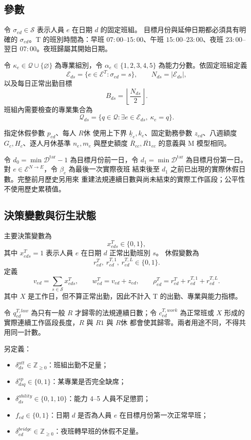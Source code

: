 \documentclass[a4paper,12pt]{article}
\begin{document}
\subsection{參數}

令 \(\sigma_{ed}\in\mathcal{S}\) 表示人員 \(e\) 在日期 \(d\) 的固定班組。
目標月份與延伸日期都必須具有明確的 \(\sigma_{ed}\)。T 的班別時間為：早班
\(07{:}00\)--\(15{:}00\)、午班 \(15{:}00\)--\(23{:}00\)、夜班
\(23{:}00\)--翌日 \(07{:}00\)。夜班歸屬其開始日期。

令 \(\kappa_e\in\mathcal{Q}\cup\{\varnothing\}\) 為專業組別，令
\(\alpha_e\in\{1,2,3,4,5\}\) 為能力分數。依固定班組定義
\[
  \mathcal{E}_{ds}
  =
  \{e\in\mathcal{E}^{T}:\sigma_{ed}=s\},
  \qquad
  N_{ds}=|\mathcal{E}_{ds}|,
\]
以及每日正常出勤目標
\[
  B_{ds}=\left\lfloor\frac{N_{ds}}{2}\right\rfloor.
\]
班組內需要檢查的專業集合為
\[
  \mathcal{Q}_{ds}
  =
  \{q\in\mathcal{Q}:\exists e\in\mathcal{E}_{ds},\ \kappa_e=q\}.
\]

指定休假參數 \(p_{ed}\)、每人 \(R休\) 使用上下界 \(\underline{k}_e,k_e\)、固定勤務參數 \(z_{ed}\)、八週額度
\(G_c,H_c\)、逐人月休基準 \(n_e,m_e\) 與歷史額度
\(\overline{R}_{ec},\overline{R1}_{ec}\) 的意義與 M 模型相同。

令 \(d_0=\min\mathcal{D}^{\mathrm{tar}}-1\) 為目標月份前一日，令
\(d_1=\min\mathcal{D}^{\mathrm{tar}}\) 為目標月份第一日。對
\(e\in\mathcal{E}^{N\rightarrow E}\)，令 \(\beta_e\) 為最後一次實際夜班
結束後至 \(d_1\) 之前已出現的實際休假日數。完整前月歷史另用來
重建法規連續日數與尚未結束的實際工作區段；公平性不使用歷史累積值。

\subsection{決策變數與衍生狀態}

主要決策變數為
\[
  x^{T}_{eds}\in\{0,1\},
\]
其中 \(x^{T}_{eds}=1\) 表示人員 \(e\) 在日期 \(d\) 正常出勤班別 \(s\)。
休假變數為
\[
  r^{T}_{ed},\ r^{T,1}_{ed},\ r^{T,L}_{ed}\in\{0,1\}.
\]
定義
\[
  v_{ed}=\sum_{s\in\mathcal{S}}x^{T}_{eds},
  \qquad
  w^{T}_{ed}=v_{ed}+z_{ed},
  \qquad
  \rho^{T}_{ed}=r^{T}_{ed}+r^{T,1}_{ed}+r^{T,L}_{ed}.
\]
其中 \(X\) 是工作日，但不算正常出勤，因此不計入 T 的出勤、專業與能力指標。

令 \(q^{T,law}_{ed}\) 為只有一般 \(R\) 才歸零的法規連續日數；令
\(c^{T,work}_{ed}\) 為正常班或 \(X\) 形成的實際連續工作區段長度，\(R\) 與
\(R1\) 與 \(R休\) 都會使其歸零。兩者用途不同，不得共用同一計數。

另定義：
\begin{itemize}
  \item \(\delta^{att}_{ds}\in\mathbb{Z}_{\geq0}\)：班組出勤不足量；
  \item \(\delta^{sp}_{dsq}\in\{0,1\}\)：某專業是否完全缺席；
  \item \(\delta^{ability}_{ds}\in\{0,1,10\}\)：能力 4--5 人員不足懲罰；
  \item \(f_{ed}\in\{0,1\}\)：日期 \(d\) 是否為人員 \(e\) 在目標月份第一次正常早班；
  \item \(\delta^{bridge}_{ed}\in\mathbb{Z}_{\geq0}\)：夜班轉早班的休假不足量。
\end{itemize}
\end{document}
